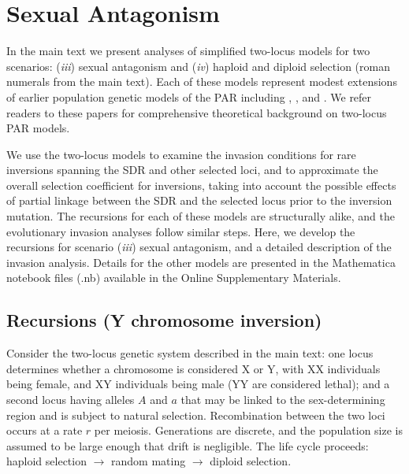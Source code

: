 \documentclass{article}
\begin{document}
 \section{Sexual Antagonism}\label{AppB}
 \renewcommand{\theequation}{B\arabic{equation}}
 \setcounter{equation}{0}
 \renewcommand{\thefigure}{B\arabic{figure}}
 \setcounter{figure}{0}

In the main text we present analyses of simplified two-locus models for two scenarios: ({\itshape iii}) sexual antagonism and ({\itshape iv}) haploid and diploid selection (roman numerals from the main text). Each of these models represent modest extensions of earlier population genetic models of the PAR including \citet{Clark1987}, \citet{Otto2011}, and \citet{Otto2014, Otto2019}. We refer readers to these papers for comprehensive theoretical background on two-locus PAR models. 

We use the two-locus models to examine the invasion conditions for rare inversions spanning the SDR and other selected loci, and to approximate the overall selection coefficient for inversions, taking into account the possible effects of partial linkage between the SDR and the selected locus prior to the inversion mutation. The recursions for each of these models are structurally alike, and the evolutionary invasion analyses follow similar steps. Here, we develop the recursions for scenario ({\itshape iii}) sexual antagonism, and a detailed description of the invasion analysis. Details for the other models are presented in the Mathematica notebook files (.nb) available in the Online Supplementary Materials.


\subsection{Recursions (Y chromosome inversion)}

Consider the two-locus genetic system described in the main text: one locus determines whether a chromosome is considered X or Y, with XX individuals being female, and XY individuals being male (YY are considered lethal); and a second locus having alleles $A$ and $a$ that may be linked to the sex-determining region and is subject to natural selection. Recombination between the two loci occurs at a rate $r$ per meiosis. Generations are discrete, and the population size is assumed to be large enough that drift is negligible. The life cycle proceeds: haploid selection $\rightarrow$ random mating $\rightarrow$ diploid selection.
\end{document}
